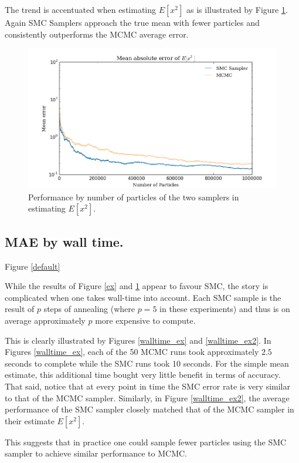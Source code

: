 \documentclass[12pt]{elsarticle}
\begin{document}
The trend is accentuated when estimating $E[x^2]$ as is illustrated by Figure \ref{ex2}. Again SMC Samplers approach the true mean with fewer particles and consistently outperforms the MCMC average error.

\begin{figure}[htbp]
\begin{center}
\includegraphics[width = \textwidth]{plots/E_X2.png}
\caption{Performance by number of particles of the two samplers in estimating $E[x^2]$.}
\label{ex2}
\end{center}
\end{figure}

\subsection*{MAE by wall time. }
Figure \ref{default} 

While the results of Figure \ref{ex} and \ref{ex2} appear to favour SMC, the story is complicated when one takes wall-time into account. Each SMC sample is the result of $p$ steps of annealing (where $p=5$ in these experiments) and thus is on average approximately $p$ more expensive to compute.

This is clearly illustrated by Figures \ref{walltime_ex} and  \ref{walltime_ex2}. In Figures \ref{walltime_ex}, each of the 50 MCMC runs took approximately $2.5$ seconds to complete while the SMC runs took 10 seconds. For the simple mean estimate, this additional time bought very little benefit in terms of accuracy. That said, notice that at every point in time the SMC error rate is very similar to that of the MCMC sampler. Similarly, in Figure \ref{walltime_ex2}, the average performance of the SMC sampler closely matched that of the MCMC sampler in their estimate $E[x^2]$.

This suggests that in practice one could sample fewer particles using the SMC sampler to achieve similar performance to MCMC.
\end{document}
